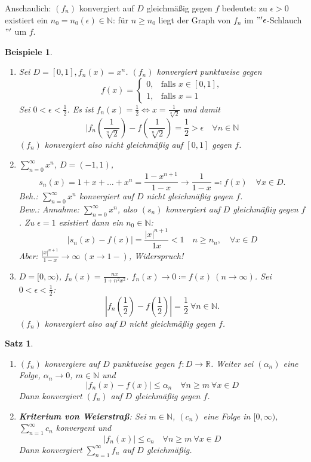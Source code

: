 \documentclass{extreport}
\newcommand{\N}{\mathbb{N}}
\newcommand{\R}{\mathbb{R}}
\theoremstyle{named}
\theoremstyle{dotless}
\newtheorem{satz}[namedtheorem]{Satz}
\newtheorem*{beispiele}{Beispiele}
\begin{document}
Anschaulich: $(f_{n})$ konvergiert auf $D$ gleichmä{\ss}ig gegen $f$ bedeutet: zu $\epsilon > 0$ existiert ein $n_{0} = n_{0}(\epsilon) \in \N$: für $n \geq n_{0}$ liegt der Graph von $f_{n}$ im $"'\epsilon$-Schlauch$"'$ um $f$.

\begin{beispiele} ~\
	\begin{enumerate}
		\item Sei $D = [0, 1], f_{n}(x) = x^{n}$. $(f_{n})$ konvergiert punktweise gegen 
			$$ f(x) = \begin{cases} 0, & \text{falls } x \in [0, 1], \\ 1, & \text{falls } x = 1 \end{cases} $$
			Sei $0 < \epsilon < \frac{1}{2}$. Es ist $f_{n}(x) = \frac{1}{2} \iff x = \frac{1}{\sqrt[n]{2}}$ und damit
				$$ |f_{n}(\frac{1}{\sqrt[n]{2}}) - f(\frac{1}{\sqrt[n]{2}}) = \frac{1}{2} > \epsilon \quad \forall n \in \N $$
			$(f_{n})$ konvergiert also nicht gleichmä{\ss}ig auf $[0, 1]$ gegen $f$.
		\item $\sum_{n=0}^{\infty} x^{n}$, $D = (-1, 1)$, 
			$$ s_{n}(x) = 1 + x + \dotsc + x^{n} = \frac{1 - x^{n+1}}{1 - x} \rightarrow \frac{1}{1 - x} \eqqcolon f(x) \quad \forall x \in D. $$
			Beh.: $\sum_{n=0}^{\infty} x^{n}$ konvergiert auf $D$ nicht gleichmä{\ss}ig gegen $f$. \\
			Bew.: Annahme: $\sum_{n=0}^{\infty} x^{n}$, also $(s_{n})$ konvergiert auf $D$ gleichmä{\ss}ig gegen $f$. Zu $\epsilon = 1$ existiert dann ein $n_{0} \in \N$:
			$$ | s_{n}(x) - f(x) | = \frac{|x|^{n+1}}{1  x} < 1 \quad n \geq n_{n}, \quad \forall x \in D $$
			Aber: $\frac{|x|^{n+1}}{1 - x} \rightarrow \infty ~(x \rightarrow 1-)$, Widerspruch!
		\item $D = [0, \infty)$, $f_{n}(x) = \frac{nx}{1 + n^{2} x^{2}}$. $f_{n}(x) \rightarrow 0 \coloneqq f(x) ~(n \rightarrow \infty)$. Sei $0 < \epsilon < \frac{1}{2}$: 
			$$ |f_{n}(\frac{1}{2}) - f(\frac{1}{2})| = \frac{1}{2} ~\forall n \in \N. $$
			$(f_{n})$ konvergiert also auf $D$ nicht gleichmäßig gegen $f$.
	\end{enumerate}	
\end{beispiele}

\begin{satz} ~\ \label{8.1:satz}
	\begin{enumerate}
		\item $(f_{n})$ konvergiere auf $D$ punktweise gegen $f \colon D \rightarrow \R$. Weiter sei $(\alpha_{n})$ eine Folge, $\alpha_{n} \rightarrow 0$, $m \in \N$ und
			$$ |f_{n}(x) - f(x) | \leq \alpha_{n} \quad \forall n \geq m ~\forall x \in D $$
			Dann konvergiert $(f_{n})$ auf $D$ gleichmä{\ss}ig gegen $f$. \label{8.1.a:satz}
		\item \textbf{Kriterium von Weierstra{\ss}}: Sei $m \in \N$, $(c_{n})$ eine Folge in $[0, \infty)$, $\sum_{n=1}^{\infty} c_{n}$ konvergent und
			$$ | f_{n}(x) | \leq c_{n} \quad \forall n \geq m ~\forall x \in D $$
			Dann konvergiert $\sum_{n=1}^{\infty} f_{n}$ auf $D$ gleichmä{\ss}ig. \label{8.1.b:satz}
	\end{enumerate}
\end{satz}
\end{document}
